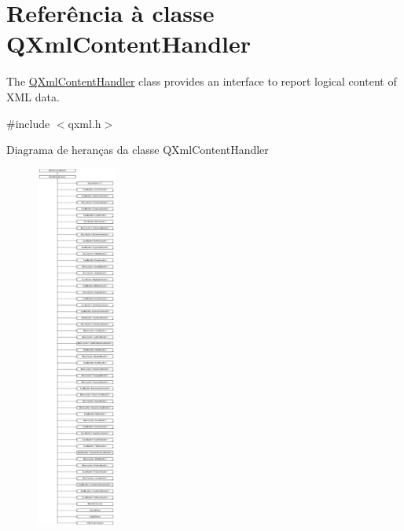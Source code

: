 \hypertarget{class_q_xml_content_handler}{\section{Referência à classe Q\-Xml\-Content\-Handler}
\label{class_q_xml_content_handler}
}


The \hyperlink{class_q_xml_content_handler}{Q\-Xml\-Content\-Handler} class provides an interface to report logical content of X\-M\-L data.  




{\ttfamily \#include $<$qxml.\-h$>$}

Diagrama de heranças da classe Q\-Xml\-Content\-Handler\begin{figure}[H]
\begin{center}
\leavevmode
\includegraphics[height=12.000000cm]{class_q_xml_content_handler}
\end{center}
\end{figure}
